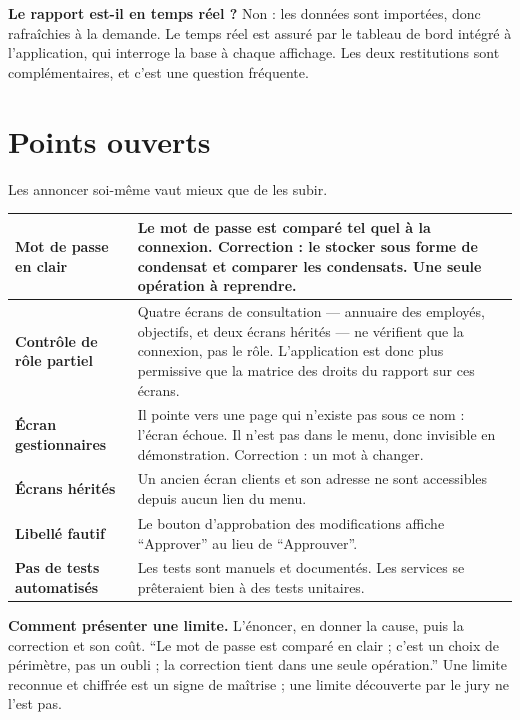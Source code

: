 \documentclass[a4paper,11pt]{article}
\begin{document}
\begin{note}
\textbf{Le rapport est-il en temps réel ?} Non : les données sont importées,
donc rafraîchies à la demande. Le temps réel est assuré par le tableau de bord
intégré à l'application, qui interroge la base à chaque affichage. Les deux
restitutions sont complémentaires, et c'est une question fréquente.
\end{note}

\section{Points ouverts}

Les annoncer soi-même vaut mieux que de les subir.

\noindent\begin{tabularx}{\textwidth}{|>{\bfseries}L{4cm}|X|}
\hline
Mot de passe en clair & Le mot de passe est comparé tel quel à la connexion. Correction : le stocker sous forme de condensat et comparer les condensats. Une seule opération à reprendre.\\
\hline
Contrôle de rôle partiel & Quatre écrans de consultation --- annuaire des employés, objectifs, et deux écrans hérités --- ne vérifient que la connexion, pas le rôle. L'application est donc plus permissive que la matrice des droits du rapport sur ces écrans.\\
\hline
Écran gestionnaires & Il pointe vers une page qui n'existe pas sous ce nom : l'écran échoue. Il n'est pas dans le menu, donc invisible en démonstration. Correction : un mot à changer.\\
\hline
Écrans hérités & Un ancien écran clients et son adresse ne sont accessibles depuis aucun lien du menu.\\
\hline
Libellé fautif & Le bouton d'approbation des modifications affiche \enquote{Approver} au lieu de \enquote{Approuver}.\\
\hline
Pas de tests automatisés & Les tests sont manuels et documentés. Les services se prêteraient bien à des tests unitaires.\\
\hline
\end{tabularx}

\vspace{0.8em}
\begin{retenir}
\textbf{Comment présenter une limite.} L'énoncer, en donner la cause, puis la
correction et son coût. \enquote{Le mot de passe est comparé en clair ; c'est un
choix de périmètre, pas un oubli ; la correction tient dans une seule
opération.} Une limite reconnue et chiffrée est un signe de maîtrise ; une
limite découverte par le jury ne l'est pas.
\end{retenir}
\end{document}
